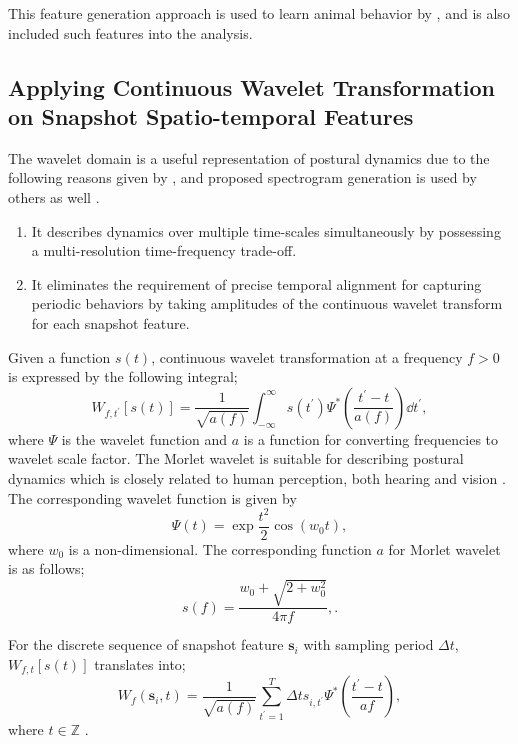 This feature generation approach is used to learn animal behavior by \citet{kabra_jaaba_2013}, and \citet{marshall_continuous_2021} is also included such features into the analysis.

\subsection{Applying Continuous Wavelet Transformation on Snapshot Spatio-temporal Features}
The wavelet domain is a useful representation of postural dynamics due to the following reasons given by \citet{berman_mapping_2014}, and proposed spectrogram generation is used by others as well \citep{marshall_continuous_2021, todd_systematic_2017}.
\begin{enumerate}
	\item It describes dynamics over multiple time-scales simultaneously by possessing a multi-resolution time-frequency trade-off.
	\item It eliminates the requirement of precise temporal alignment for capturing periodic behaviors by taking amplitudes of the continuous wavelet transform for each snapshot feature.
\end{enumerate}
Given a function $s(t)$, continuous wavelet transformation at a frequency $f>0$ is expressed by the following integral;
\begin{equation}
	W_{f,t^{\prime}}[s(t)] = \frac{1}{\sqrt{a(f)}} \int_{-\infty}^{\infty} s(t^{\prime}) \mathit{\Psi}^{\ast}\left(\frac{t^{\prime}-t}{a(f)}\right) \dd{t^{\prime}},
\end{equation}
where $\Psi$ is the wavelet function and $a$ is a function for converting frequencies to wavelet scale factor.
The Morlet wavelet is suitable for describing postural dynamics which is closely related to human perception, both hearing and vision \citep{daugman_uncertainty_1985}.
The corresponding wavelet function is given by
\begin{equation}
	\Psi(t) = \exp{\frac{t^2}{2}} \cos(w_0t),
\end{equation}
where $w_0$ is a non-dimensional. The corresponding function $a$ for Morlet wavelet is as follows;
\begin{equation}
	s(f) = \frac{w_0 + \sqrt{2+w_0^2}}{4 \pi f},.
\end{equation}

For the discrete sequence of snapshot feature $\mathbf{s}_i$ with sampling period $\Delta t$, $W_{f,t}[s(t)]$ translates into;
\begin{equation}
	\label{eq:wavelet-practical}
	W_{f}(\mathbf{s}_i, t) = \frac{1}{\sqrt{a(f)}} \sum_{t^{\prime}=1}^{T} {\Delta t} s_{i,t^{\prime}} \mathit{\Psi}^{\ast}\left(\frac{t^{\prime}-t}{a{f}}\right),
\end{equation}
where $t \in \mathbb{Z}$ \citep{torrence_practical_1998}.

